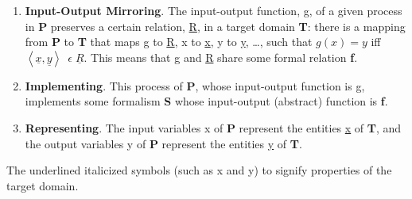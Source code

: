 \documentclass{article}
\begin{document}
\begin{enumerate}
    \item \textbf{Input-Output Mirroring}. The input-output function, g, of a given process in \textbf{P} preserves a certain relation, \underline{R}, in a target domain \textbf{T}: there is a mapping from \textbf{P} to \textbf{T} that maps g to \underline{R}, x to \underline{x}, y to \underline{y}, \dots , such that $g(x) = y$ iff $\left\langle \underline{x},\underline{y} \right\rangle\ \; \epsilon \; \underline{R}$. This means that g and \underline{R} share some formal relation \textbf{f}.
    \item \textbf{Implementing}. This process of \textbf{P}, whose input-output function is g, implements some formalism \textbf{S} whose input-output (abstract) function is \textbf{f}.
    \item \textbf{Representing}. The input variables x of \textbf{P} represent the entities \underline{x} of \textbf{T}, and the output variables y of \textbf{P} represent the entities \underline{y} of \textbf{T}.
\end{enumerate}

The underlined italicized symbols (such as x and y) to signify properties of the target domain.


\end{document}
